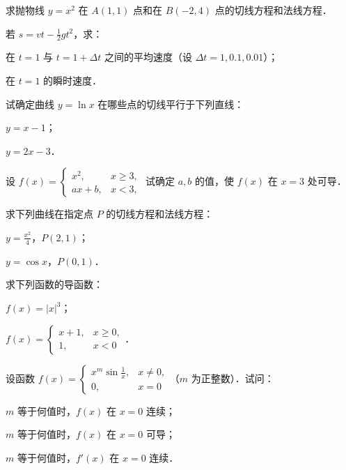 \begin{xiti}
\item 求抛物线 $y = x^2$ 在 $A(1, 1)$ 点和在 $B(-2, 4)$ 点的切线方程和法线方程．

\item 若 $s = vt - \frac{1}{2}gt^2$，求：
\begin{ziti}
\item 在 $t = 1$ 与 $t = 1 + \Delta t$ 之间的平均速度（设 $\Delta t = 1, 0.1, 0.01$）；
\item 在 $t = 1$ 的瞬时速度．
\end{ziti}

\item 试确定曲线 $y = \ln x$ 在哪些点的切线平行于下列直线：
\begin{ziti}
\item $y = x - 1$；
\item $y = 2x - 3$．
\end{ziti}

\item 设 $f(x) = \begin{cases} x^2, & x \geqslant 3, \\ ax + b, & x < 3, \end{cases}$ 试确定 $a, b$ 的值，使 $f(x)$ 在 $x = 3$ 处可导．

\item 求下列曲线在指定点 $P$ 的切线方程和法线方程：
\begin{ziti}
\item $y = \frac{x^2}{4}$，$P(2, 1)$；
\item $y = \cos x$，$P(0, 1)$．
\end{ziti}

\item 求下列函数的导函数：
\begin{ziti}
\item $f(x) = |x|^3$；
\item $f(x) = \begin{cases} x + 1, & x \geqslant 0, \\ 1, & x < 0 \end{cases}$．
\end{ziti}

\item 设函数 $f(x) = \begin{cases} x^m \sin\frac{1}{x}, & x \neq 0, \\ 0, & x = 0 \end{cases}$（$m$ 为正整数）．试问：
\begin{ziti}
\item $m$ 等于何值时，$f(x)$ 在 $x = 0$ 连续；
\item $m$ 等于何值时，$f(x)$ 在 $x = 0$ 可导；
\item $m$ 等于何值时，$f'(x)$ 在 $x = 0$ 连续．
\end{ziti}


\end{xiti}
